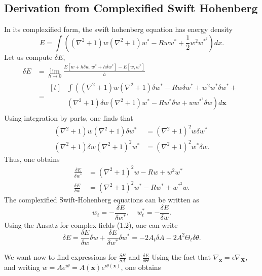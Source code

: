 \documentclass[12pt]{article}
\numberwithin{equation}{section}
\begin{document}
\subsection{Derivation from Complexified Swift Hohenberg}
\par In its complexified form, the swift hohenberg equation has energy density
\begin{equation}
E = \int \left( (\nabla^2+1)w(\nabla^2+1)w^{*}-Rww^{*}+\frac{1}{2}w^2w^{*^2}\right)dx.
\end{equation}
Let us compute $\delta E$,
\begin{align*}
\delta E &= \lim_{h \rightarrow 0}\frac{E[w+h\delta w, w^* + h\delta w^*]-E[w,w^*]}{h}\\
    &= \begin{aligned}[t]
        & \int \left( (\nabla^2+1)w(\nabla^2+1)\delta w^* -Rw\delta w^* + w^2w^*\delta w^* + \right. \\
        & \left. (\nabla^2+1)\delta w (\nabla^2+1)w^* -Rw^*\delta w + ww^{*^2}\delta w \right) d\bm{x}
    \end{aligned}
\end{align*}
Using integration by parts, one finds that
\begin{align*}
(\nabla^2+1)w(\nabla^2+1)\delta w^* &= (\nabla^2 +1)^2w\delta w^*\\
(\nabla^2+1)\delta w (\nabla^2+1)^2w^* &= (\nabla^2+1)^2w^*\delta w.
\end{align*}
Thus, one obtains
\begin{align}
\frac{\delta E}{\delta w^*} &= (\nabla^2+1)^2w - Rw + w^2w^*\\
\frac{\delta E}{\delta w} &= (\nabla^2+1)^2 w^* -Rw^* + w^{*^2}w.
\end{align}
The complexified Swift-Hohenberg equations can be written as
\begin{equation}
w_t = - \frac{\delta E}{\delta w^*}, \quad w^*_t = -\frac{\delta E}{\delta w}.
\end{equation}
Using the Ansatz for complex fields (1.2), one can write
\begin{equation}
\delta E = \frac{\delta E}{\delta w}\delta w + \frac{\delta E}{\delta w^*}\delta w^* = -2A_t\delta A - 2A^2\Theta_t \delta \theta.
\end{equation}
\par We want now to find expressions for $\frac{\delta E}{\delta A}$ and $\frac{\delta E}{\delta \Theta}$
Using the fact that $\nabla_{\bm{x}} = \epsilon\nabla_{\bm{X}}$, and writing $w=Ae^{i\theta}=A(\bm{x})e^{i\theta(\bm{x})}$, one obtains
\end{document}
